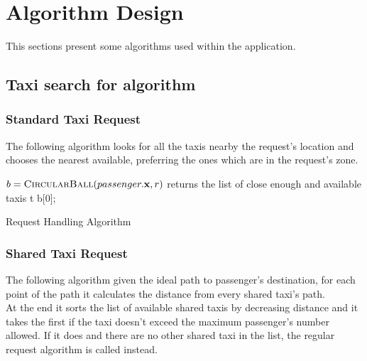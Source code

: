 
\section{Algorithm Design}

This sections present some algorithms used within the application.

\subsection{Taxi search for algorithm}

\subsubsection{Standard Taxi Request}
The following algorithm looks for all the taxis nearby the request's location and chooses the nearest available, preferring the ones which are in the request's zone.

\begin{algorithm}[]
\begin{algorithmic}[1]

\State $ b = \Call{CircularBall}{passenger.{\bf x}, r}$ \Comment returns the list of close enough and available taxis
        \State \Return {}
    \Else
                \State \Return t
            \EndIf
        \EndFor
        \State \Return b[0];
    \EndIf
\EndFunction

\end{algorithmic}
\caption{
    \label{alg:stdreqhandler} Request Handling Algorithm}
\end{algorithm}


\subsubsection{Shared Taxi Request}
The following algorithm given the ideal path to passenger's destination, for each point of the path it calculates the distance from every shared taxi's path.\\
At the end it sorts the list of available shared taxis by decreasing distance and it takes the first if the taxi doesn't exceed the maximum passenger's number allowed. If it does and there are no other shared taxi in the list, the regular request algorithm is called instead.

